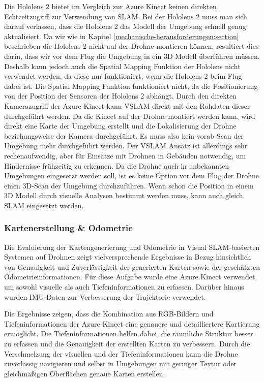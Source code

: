 Die Hololens 2 bietet im Vergleich zur Azure Kinect keinen direkten Echtzeitzugriff zur Verwendung von \ac{SLAM}. Bei der Hololens 2 muss man sich darauf verlassen, dass die Hololens 2 das Modell der Umgebung schnell genug aktualisiert. Da wir wie in Kapitel \ref{mechanische-herausforderungen:section} beschrieben die Hololens 2 nicht auf der Drohne montieren können, resultiert dies darin, dass wir vor dem Flug die Umgebung in ein 3D Modell überführen müssen. Deshalb kann jedoch auch die Spatial Mapping Funktion der Hololens nicht verwendet werden, da diese nur funktioniert, wenn die Hololens 2 beim Flug dabei ist.
Die Spatial Mapping Funktion funktioniert nicht, da die Positionierung von der Position der Sensoren der Hololens 2 abhängt.
Durch den direkten Kamerazugriff der Azure Kinect kann \ac{VSLAM} direkt mit den Rohdaten dieser durchgeführt werden. Da die Kinect auf der Drohne montiert werden kann, wird direkt eine Karte der Umgebung erstellt und die Lokalisierung der Drohne beziehungsweise der Kamera durchgeführt. Es muss also kein vorab Scan der Umgebung mehr durchgeführt werden. Der \ac{VSLAM} Ansatz ist allerdings sehr rechenaufwendig, aber für Einsätze mit Drohnen in Gebäuden notwendig, um Hindernisse frühzeitig zu erkennen. Da die Drohne auch in unbekannten Umgebungen eingesetzt werden soll, ist es keine Option vor dem Flug der Drohne einen 3D-Scan der Umgebung durchzuführen. Wenn schon die Position in einem 3D Modell durch visuelle Analysen bestimmt werden muss, kann auch gleich \ac{SLAM} eingesetzt werden.

\subsubsection{Kartenerstellung \& Odometrie}

Die Evaluierung der Kartengenerierung und Odometrie in Visual SLAM-basierten Systemen auf Drohnen zeigt vielversprechende Ergebnisse in Bezug hinsichtlich von Genauigkeit und Zuverlässigkeit der generierten Karten sowie der geschätzten Odometrieinformationen. Für diese Aufgabe wurde eine Azure Kinect verwendet, um sowohl visuelle als auch Tiefeninformationen zu erfassen. Darüber hinaus wurden \ac{IMU}-Daten zur Verbesserung der Trajektorie verwendet.

Die Ergebnisse zeigen, dass die Kombination aus RGB-Bildern und Tiefeninformationen der Azure Kinect eine genauere und detailliertere Kartierung ermöglicht. Die Tiefeninformationen helfen dabei, die räumliche Struktur besser zu erfassen und die Genauigkeit der erstellten Karten zu verbessern. Durch die Verschmelzung der visuellen und der Tiefeninformationen kann die Drohne zuverlässig navigieren und selbst in Umgebungen mit geringer Textur oder gleichmäßigen Oberflächen genaue Karten erstellen.

